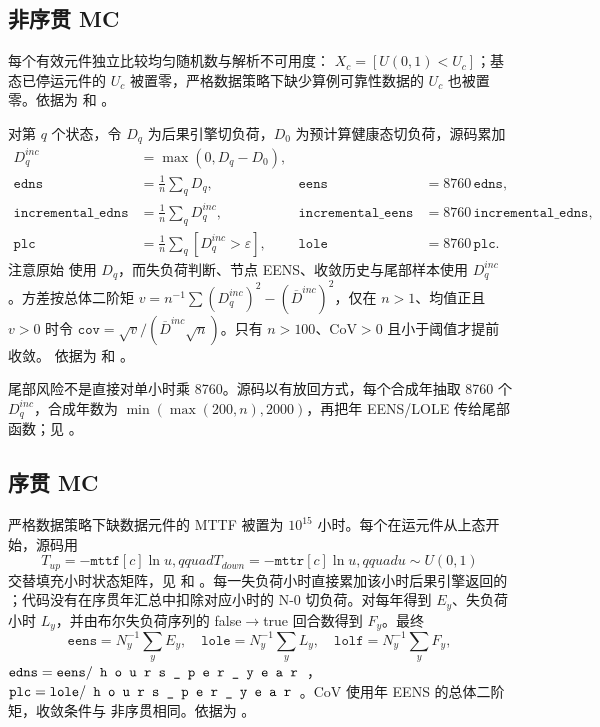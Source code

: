 \subsection{非序贯 MC}

每个有效元件独立比较均匀随机数与解析不可用度：
$X_c=[U(0,1)<U_c]$；基态已停运元件的 $U_c$ 被置零，严格数据策略下缺少算例可靠性数据的
$U_c$ 也被置零。依据为  和
。

对第 $q$ 个状态，令 $D_q$ 为后果引擎切负荷，$D_0$ 为预计算健康态切负荷，源码累加
\begin{align}
 D_q^{inc}&=\max(0,D_q-D_0),\\
 \texttt{edns}&=\frac1n\sum_qD_q,&
 \texttt{eens}&=8760\,\texttt{edns},\\
 \texttt{incremental\_edns}&=\frac1n\sum_qD_q^{inc},&
 \texttt{incremental\_eens}&=8760\,\texttt{incremental\_edns},\\
 \texttt{plc}&=\frac1n\sum_q[D_q^{inc}>\varepsilon],&
 \texttt{lole}&=8760\,\texttt{plc}.
\end{align}
注意原始  使用 $D_q$，而失负荷判断、节点 EENS、收敛历史与尾部样本使用
$D_q^{inc}$。方差按总体二阶矩
$v=n^{-1}\sum(D_q^{inc})^2-(\overline D^{inc})^2$，仅在
$n>1$、均值正且 $v>0$ 时令
$\texttt{cov}=\sqrt v/(\overline D^{inc}\sqrt n)$。只有
$n>100$、CoV$>0$ 且小于阈值才提前收敛。
依据为  和
。

尾部风险不是直接对单小时乘 8760。源码以有放回方式，每个合成年抽取 8760 个
$D_q^{inc}$，合成年数为
$\min(\max(200,n),2000)$，再把年 EENS/LOLE 传给尾部函数；见
。

\subsection{序贯 MC}

严格数据策略下缺数据元件的 MTTF 被置为 $10^{15}$ 小时。每个在运元件从上态开始，源码用
\begin{equation}
 T_{up}=-\texttt{mttf}[c]\ln u,qquad
 T_{down}=-\texttt{mttr}[c]\ln u,qquad u\sim U(0,1)
\end{equation}
交替填充小时状态矩阵，见  和
。每一失负荷小时直接累加该小时后果引擎返回的
；代码没有在序贯年汇总中扣除对应小时的 N-0 切负荷。对每年得到
$E_y$、失负荷小时 $L_y$，并由布尔失负荷序列的 false$\to$true 回合数得到 $F_y$。最终
\begin{equation}
 \texttt{eens}=N_y^{-1}\sum_yE_y,\quad
 \texttt{lole}=N_y^{-1}\sum_yL_y,\quad
 \texttt{lolf}=N_y^{-1}\sum_yF_y,
\end{equation}
$\texttt{edns}=\texttt{eens}/\fld{hours\_per\_year}$，
$\texttt{plc}=\texttt{lole}/\fld{hours\_per\_year}$。CoV 使用年 EENS 的总体二阶矩，收敛条件与
非序贯相同。依据为 。

